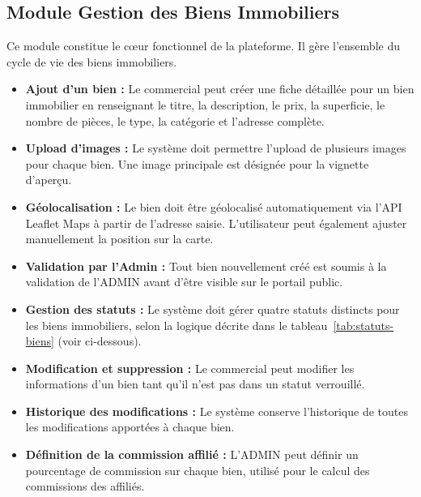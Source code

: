 \documentclass[a4paper,12pt]{report}
\begin{document}
\subsection{Module Gestion des Biens Immobiliers}

Ce module constitue le cœur fonctionnel de la plateforme. Il gère l'ensemble du cycle de vie des biens immobiliers.

\begin{itemize}
    \item \textbf{Ajout d'un bien :} Le commercial peut créer une fiche détaillée pour un bien immobilier en renseignant le titre, la description, le prix, la superficie, le nombre de pièces, le type, la catégorie et l'adresse complète.
    \item \textbf{Upload d'images :} Le système doit permettre l'upload de plusieurs images pour chaque bien. Une image principale est désignée pour la vignette d'aperçu.
    \item \textbf{Géolocalisation :} Le bien doit être géolocalisé automatiquement via l'API Leaflet Maps à partir de l'adresse saisie. L'utilisateur peut également ajuster manuellement la position sur la carte.
    \item \textbf{Validation par l'Admin :} Tout bien nouvellement créé est soumis à la validation de l'ADMIN avant d'être visible sur le portail public.
    \item \textbf{Gestion des statuts :} Le système doit gérer quatre statuts distincts pour les biens immobiliers, selon la logique décrite dans le tableau~\ref{tab:statuts-biens} (voir ci-dessous).
    \item \textbf{Modification et suppression :} Le commercial peut modifier les informations d'un bien tant qu'il n'est pas dans un statut verrouillé.
    \item \textbf{Historique des modifications :} Le système conserve l'historique de toutes les modifications apportées à chaque bien.
    \item \textbf{Définition de la commission affilié :} L'ADMIN peut définir un pourcentage de commission sur chaque bien, utilisé pour le calcul des commissions des affiliés.
\end{itemize}
\end{document}
